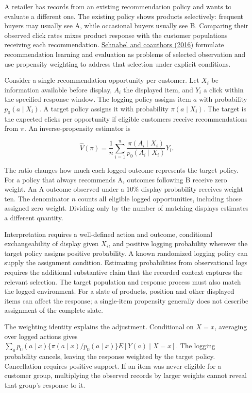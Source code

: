 \noindent A retailer has records from an existing recommendation policy and wants
to evaluate a different one. The existing policy shows products
selectively: frequent buyers may usually see A, while occasional buyers
usually see B. Comparing their observed click rates mixes product
response with the customer populations receiving each recommendation.
\href{https://proceedings.mlr.press/v48/schnabel16.html}{Schnabel and
coauthors (2016)} formulate recommendation learning and evaluation as
problems of selected observation and use propensity weighting to address
that selection under explicit conditions.

Consider a single recommendation opportunity per customer. Let \(X_i\)
be information available before display, \(A_i\) the displayed item, and
\(Y_i\) a click within the specified response window. The logging policy
assigns item \(a\) with probability \(p_0(a\mid X_i)\). A target policy
assigns it with probability \(\pi(a\mid X_i)\). The target is the
expected clicks per opportunity if eligible customers receive
recommendations from \(\pi\). An inverse-propensity estimator is

\[
\widehat V(\pi)=\frac{1}{n}\sum_{i=1}^{n}
\frac{\pi(A_i\mid X_i)}{p_0(A_i\mid X_i)}Y_i.
\]

The ratio changes how much each logged outcome represents the target
policy. For a policy that always recommends A, outcomes following B
receive zero weight. An A outcome observed under a 10\% display
probability receives weight ten. The denominator \(n\) counts all
eligible logged opportunities, including those assigned zero weight.
Dividing only by the number of matching displays estimates a different
quantity.

Interpretation requires a well-defined action and outcome, conditional
exchangeability of display given \(X_i\), and positive logging
probability wherever the target policy assigns positive probability. A
known randomized logging policy can supply the assignment condition.
Estimating probabilities from observational logs requires the additional
substantive claim that the recorded context captures the relevant
selection. The target population and response process must also match
the logged environment. For a slate of products, position and other
displayed items can affect the response; a single-item propensity
generally does not describe assignment of the complete slate.

The weighting identity explains the adjustment. Conditional on \(X=x\),
averaging over logged actions gives
\(\sum_a p_0(a\mid x)\{\pi(a\mid x)/p_0(a\mid x)\}E[Y(a)\mid X=x]\). The
logging probability cancels, leaving the response weighted by the target
policy. Cancellation requires positive support. If an item was never
eligible for a customer group, multiplying the observed records by
larger weights cannot reveal that group's response to it.

